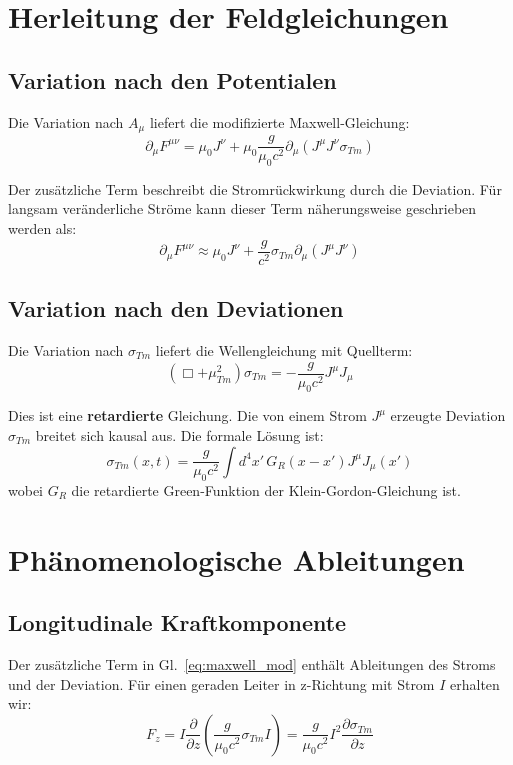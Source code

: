 \documentclass[10pt, a4paper]{article}
\begin{document}
	\section{Herleitung der Feldgleichungen}
	\subsection{Variation nach den Potentialen}
	Die Variation nach $A_\mu$ liefert die modifizierte Maxwell-Gleichung:
	\begin{equation}
		\partial_\mu F^{\mu\nu} = \mu_0 J^\nu + \mu_0 \frac{g}{\mu_0 c^2} \partial_\mu (J^\mu J^\nu \sigma_{Tm}) \label{eq:maxwell_mod}
	\end{equation}
	
	Der zusätzliche Term beschreibt die Stromrückwirkung durch die Deviation. Für langsam veränderliche Ströme kann dieser Term näherungsweise geschrieben werden als:
	\begin{equation}
		\partial_\mu F^{\mu\nu} \approx \mu_0 J^\nu + \frac{g}{c^2} \sigma_{Tm} \partial_\mu (J^\mu J^\nu) \label{eq:maxwell_approx}
	\end{equation}
	
	\subsection{Variation nach den Deviationen}
	Die Variation nach $\sigma_{Tm}$ liefert die Wellengleichung mit Quellterm:
	\begin{equation}
		(\Box + \mu_{Tm}^2) \sigma_{Tm} = -\frac{g}{\mu_0 c^2} J^\mu J_\mu \label{eq:sigma_eq}
	\end{equation}
	
	Dies ist eine \textbf{retardierte} Gleichung. Die von einem Strom $J^\mu$ erzeugte Deviation $\sigma_{Tm}$ breitet sich kausal aus. Die formale Lösung ist:
	\begin{equation}
		\sigma_{Tm}(x,t) = \frac{g}{\mu_0 c^2} \int d^4x' \, G_R(x-x') J^\mu J_\mu(x') \label{eq:sigma_solution}
	\end{equation}
	wobei $G_R$ die retardierte Green-Funktion der Klein-Gordon-Gleichung ist.
	
	\section{Phänomenologische Ableitungen}
	\subsection{Longitudinale Kraftkomponente}
	Der zusätzliche Term in Gl.~\ref{eq:maxwell_mod} enthält Ableitungen des Stroms und der Deviation. Für einen geraden Leiter in z-Richtung mit Strom $I$ erhalten wir:
	\begin{equation}
		F_z = I \frac{\partial}{\partial z} \left( \frac{g}{\mu_0 c^2} \sigma_{Tm} I \right) = \frac{g}{\mu_0 c^2} I^2 \frac{\partial \sigma_{Tm}}{\partial z} \label{eq:long_force}
	\end{equation}
	
\end{document}
